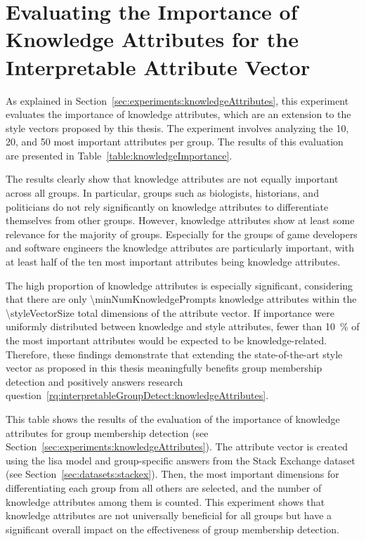 
\section{Evaluating the Importance of Knowledge Attributes for the Interpretable Attribute Vector}%
\label{sec:evaluation:knowledgeAttributes}

As explained in Section~\ref{sec:experiments:knowledgeAttributes}, this experiment evaluates the importance of knowledge attributes, which are an extension to the style vectors proposed by this thesis. The experiment involves analyzing the \num{10}, \num{20}, and \num{50} most important attributes per group. The results of this evaluation are presented in Table~\ref{table:knowledgeImportance}.

The results clearly show that knowledge attributes are not equally important across all groups. In particular, groups such as biologists, historians, and politicians do not rely significantly on knowledge attributes to differentiate themselves from other groups. However, knowledge attributes show at least some relevance for the majority of groups. Especially for the groups of game developers and software engineers the knowledge attributes are particularly important, with at least half of the ten most important attributes being knowledge attributes.

The high proportion of knowledge attributes is especially significant, considering that there are only \num{\minNumKnowledgePrompts} knowledge attributes within the \num{\styleVectorSize} total dimensions of the attribute vector. If importance were uniformly distributed between knowledge and style attributes, fewer than \SI{10}{\percent} of the most important attributes would be expected to be knowledge-related. Therefore, these findings demonstrate that extending the state-of-the-art style vector as proposed in this thesis meaningfully benefits group membership detection and positively answers research question~\ref{rq:interpretableGroupDetect:knowledgeAttributes}.

\begin{table}[ht]
  \caption[]{This table shows the results of the evaluation of the importance of knowledge attributes for group membership detection (see Section~\ref{sec:experiments:knowledgeAttributes}). The attribute vector is created using the \ac{lisa} model and group-specific answers from the Stack Exchange dataset (see Section~\ref{sec:datasets:stackex}). Then, the most important dimensions for differentiating each group from all others are selected, and the number of knowledge attributes among them is counted. This experiment shows that knowledge attributes are not universally beneficial for all groups but have a significant overall impact on the effectiveness of group membership detection.}%
  \label{table:knowledgeImportance}
  \resultKnowledgeImportance{}
\end{table}

